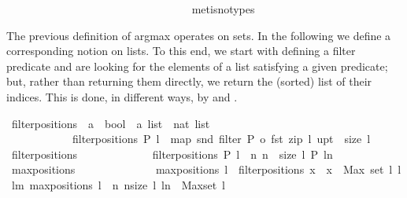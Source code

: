 \begin{isabellebody}
\ \ \ \ \ \ \ \ \ \ \ \ \ \ \ \ \ \ \ \ \ \ \ \ \ \ \ \ \ \ \ \ \isamarkupfalse%
\ {\isacharparenleft}metis{\isacharparenleft}no{\isacharunderscore}types{\isacharparenright}{\isacharparenright}%
\endisatagproof
{\isafoldproof}%
%
\isadelimproof
%
\endisadelimproof
%
\begin{isamarkuptext}%
The previous definition of argmax operates on sets. In the following we define a corresponding notion on lists. To this end, we start with defining a filter predicate and are looking for the elements of a list satisfying a given predicate;
but, rather than returning them directly, we return the (sorted) list of their indices. 
This is done, in different ways, by  and .%
\end{isamarkuptext}%
\isamarkuptrue%
\isamarkupfalse%
\ filterpositions\ {\isacharcolon}{\isacharcolon}\ {\isachardoublequoteopen}{\isacharparenleft}{\isacharprime}a\ {\isacharequal}{\isachargreater}\ bool{\isacharparenright}\ {\isacharequal}{\isachargreater}\ {\isacharprime}a\ list\ {\isacharequal}{\isachargreater}\ nat\ list{\isachardoublequoteclose}\isanewline
\ \ \ \ \ \ \ \ \ \ \ \ {\isachardoublequoteopen}filterpositions\ P\ l\ {\isacharequal}\ map\ snd\ {\isacharparenleft}filter\ {\isacharparenleft}P\ o\ fst{\isacharparenright}\ {\isacharparenleft}zip\ l\ {\isacharparenleft}upt\ {}\ {\isacharparenleft}size\ l{\isacharparenright}{\isacharparenright}{\isacharparenright}{\isacharparenright}{\isachardoublequoteclose}\isanewline
\isanewline
\isanewline
\isanewline
\isanewline
{}\isamarkupfalse%
\ filterpositions{}\ \isanewline
\ \ \ \ \ \ \ \ \ \ \ \ {\isachardoublequoteopen}filterpositions{}\ P\ l\ {\isacharequal}\ {\isacharbrackleft}n{\isachardot}\ n\ {\isasymleftarrow}\ {\isacharbrackleft}{}{\isachardot}{\isachardot}{\isacharless}size\ l{\isacharbrackright}{\isacharcomma}\ P\ {\isacharparenleft}l{\isacharbang}n{\isacharparenright}{\isacharbrackright}{\isachardoublequoteclose}\isanewline
\isanewline
{}\isamarkupfalse%
\ maxpositions\ \ \isanewline
\ \ \ \ \ \ \ \ \ \ \ \ {\isachardoublequoteopen}maxpositions\ l\ {\isacharequal}\ filterpositions{}\ {\isacharparenleft}{\isacharpercent}x\ {\isachardot}\ x\ {\isasymge}\ Max\ {\isacharparenleft}set\ l{\isacharparenright}{\isacharparenright}\ l{\isachardoublequoteclose}\isanewline
\isanewline
{}\isamarkupfalse%
\ lm{}{}{\isacharcolon}\ {\isachardoublequoteopen}maxpositions\ l\ {\isacharequal}\ {\isacharbrackleft}n{\isachardot}\ n{\isasymleftarrow}{\isacharbrackleft}{}{\isachardot}{\isachardot}{\isacharless}size\ l{\isacharbrackright}{\isacharcomma}\ l{\isacharbang}n\ {\isasymge}\ Max{\isacharparenleft}set\ l{\isacharparenright}{\isacharbrackright}{\isachardoublequoteclose}\ \isanewline

\end{isabellebody}
